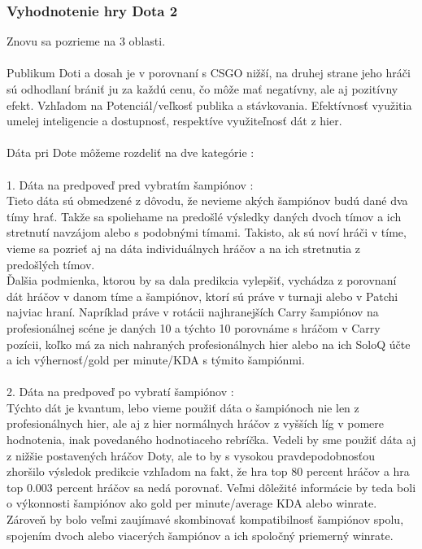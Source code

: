 \subsubsection{Vyhodnotenie hry Dota 2}
Znovu sa pozrieme na 3 oblasti. \\ \\ 
Publikum Doti a dosah je v porovnaní s CSGO nižší, na druhej strane jeho hráči sú odhodlaní brániť ju za každú cenu, čo môže mať negatívny, ale aj pozitívny efekt. Vzhľadom na  Potenciál/veľkosť publika a stávkovania. Efektívnosť využitia umelej inteligencie a dostupnosť, respektíve využiteľnosť dát z hier.
\\ \\
Dáta pri Dote môžeme rozdeliť na dve kategórie : 
\\ \\
1. Dáta na predpoveď pred vybratím šampiónov : \\
Tieto dáta sú obmedzené z dôvodu, že nevieme akých šampiónov budú dané dva tímy hrať. Takže sa spoliehame na predošlé výsledky daných dvoch tímov a ich stretnutí navzájom alebo s podobnými tímami. Takisto, ak sú noví hráči v tíme, vieme sa pozrieť aj na dáta individuálnych hráčov a na ich stretnutia z predošlých tímov. \\
Ďalšia podmienka, ktorou by sa dala predikcia vylepšiť, vychádza z porovnaní dát hráčov v danom tíme a šampiónov, ktorí sú práve v turnaji alebo v Patchi najviac hraní. Napríklad práve v rotácii najhranejších Carry šampiónov na profesionálnej scéne je daných 10 a týchto 10 porovnáme s hráčom v Carry pozícii, koľko má za nich nahraných profesionálnych hier alebo na ich SoloQ účte a ich výhernosť/gold per minute/KDA s týmito šampiónmi.  
\\ \\
2. Dáta na predpoveď po vybratí šampiónov : \\
Týchto dát je kvantum, lebo vieme použiť dáta o šampiónoch nie len z profesionálnych hier, ale aj z hier normálnych hráčov z vyšších líg v pomere hodnotenia, inak povedaného hodnotiaceho rebríčka. Vedeli by sme použiť dáta aj z nižšie postavených hráčov Doty, ale to by s vysokou pravdepodobnosťou zhoršilo výsledok predikcie vzhľadom na fakt, že hra top 80 percent hráčov a hra top 0.003 percent hráčov sa nedá porovnať. Veľmi dôležité informácie by teda boli o výkonnosti šampiónov ako gold per minute/average KDA alebo winrate. Zároveň by bolo veľmi zaujímavé skombinovať kompatibilnosť šampiónov spolu, spojením dvoch alebo viacerých šampiónov a ich spoločný priemerný winrate.


